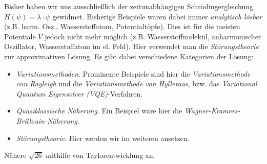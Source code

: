 \documentclass{subfiles}
\begin{document}
Bisher haben wir uns ausschließlich der zeitunabhängigen Schrödingergleichung $H(\psi) = \lambda\cdot\psi$ gewidmet. Bisherige Beispiele waren dabei immer \emph{analytisch lösbar} (z.B. harm. Osz., Wasserstoffatom, Potentialtöpfe). Dies ist für die meisten Potentiale $V$ jedoch nicht mehr möglich (z.B. Wasserstoffmolekül, anharmonischer Oszillator, Wasserstoffatom im el. Feld). Hier verwendet man die \emph{Störungstheorie} zur approximativen Lösung. Es gibt dabei verschiedene Kategorien der Lösung:
\begin{itemize}[label=$\to$]
    \item \emph{Variationsmethoden}. Prominente Beispiele sind hier die \emph{Variationsmethode von Rayleigh} und die \emph{Variationsmethode von Hylleraas}, bzw. das \emph{Variational Quantum Eigensolver (VQE)}-Verfahren.
    \item \emph{Quasiklassische Näherung}. Ein Beispiel wäre hier die \textit{Wagner-Kramers-Brillouin-Näherung}.
    \item \emph{Störungstheorie}. Hier werden wir im weiteren ansetzen. 
\end{itemize}
\begin{Aufgabe}
    \nr{} Nähere $\sqrt{26}$ mithilfe von Taylorentwicklung an. 
\end{Aufgabe}
\end{document}
